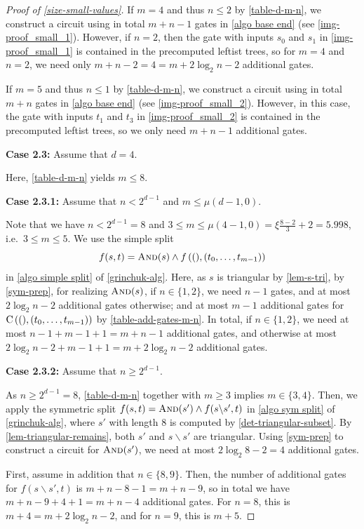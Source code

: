 \begin{proof}[Proof of \cref{size-small-values}]
If $m = 4$ and thus $n \leq 2$ by \cref{table-d-m-n},
we construct a circuit using in total $m + n - 1$ gates in \cref{algo base end}
(see \cref{img-proof_small_1}). However, if $n=2$, then the gate with inputs $s_0$
and $s_1$ in \cref{img-proof_small_1} is contained in the precomputed leftist trees,
so for $m=4$ and $n=2$, we need only $m+n-2 = 4 = m+2\log_2 n - 2$ additional gates.


If $m = 5$ and thus $n \leq 1$ by \cref{table-d-m-n},
we construct a circuit using in total $m + n$ gates in \cref{algo base end}
(see \cref{img-proof_small_2}). However, in this case, the gate with inputs $t_1$
and $t_3$ in \cref{img-proof_small_2} is contained in the precomputed leftist trees,
so we only need $m + n - 1$ additional gates.
 

\textbf{Case 2.3:} Assume that $d = 4$.

Here, \cref{table-d-m-n} yields $m \leq 8$.

\textbf{Case 2.3.1:} Assume that $n < 2^{d-1}$ and $m \leq \mu(d-1, 0)$.

 Note that we have $n < 2^{d-1} = 8$ and $3 \leq m \leq \mu(4-1, 0) = \xi \frac{8 - 2}{3} + 2 = 5.998$,
 i.e.\ $3 \leq m \leq 5$.
 We use the simple split
 \[f(s, t) = \operatorname{\textsc{And}}(s) \land f\left({(), (t_0, \dotsc, t_{m-1})}\right)\]
 in \cref{algo simple split} of \cref{grinchuk-alg}.
 Here, as $s$ is triangular by \cref{lem-s-tri}, by \cref{sym-prep},
 for realizing $\operatorname{\textsc{And}}(s)$, if $n \in \{1, 2\}$, we need $n - 1$ gates,
 and at most $2 \log_2 n - 2$ additional gates otherwise;
 and at most $m - 1$ additional gates for $\operatorname{C}\left({(), (t_0, \dotsc, t_{m-1})}\right)$ 
 by \cref{table-add-gates-m-n}.
 In total, if $n \in \{1, 2\}$, we need at most 
 $n - 1 + m - 1 + 1 = m + n - 1$ additional gates,
 and otherwise at most $2 \log_2 n - 2 + m - 1 + 1 = m + 2 \log_2 n - 2$ additional gates.

\textbf{Case 2.3.2:} Assume that $n \geq 2^{d-1}$.

 As $n \geq 2^{d-1} = 8$, \cref{table-d-m-n} together with $m \geq 3$ implies $m \in\{3,4\}$.
 Then, we apply the symmetric split $f(s, t) = \operatorname{\textsc{And}}(s') \land f(s \backslash s', t)$
 in \cref{algo sym split} of \cref{grinchuk-alg},
 where $s'$ with length $8$ is computed by \cref{det-triangular-subset}.
 By \cref{lem-triangular-remains},
 both $s'$ and $s \backslash s'$ are triangular.
 Using \cref{sym-prep} to construct a circuit for $\operatorname{\textsc{And}}(s')$,
 we need at most $2 \log_2 8 - 2 = 4$ additional gates.

 First, assume in addition that $n \in \{8,9\}$. Then, the number of 
 additional gates for $f(s \backslash s', t)$ is $m + n-8 -1 = m + n - 9$,
 so in total we have $m + n - 9 + 4 + 1 = m + n - 4$ additional gates.
 For $n = 8$, this is $m + 4= m + 2 \log_2 n - 2$, and for $n=9$,
 this is $m + 5$.


\end{proof}
